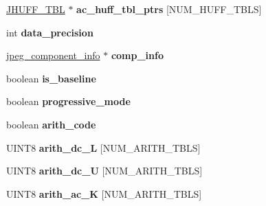\begin{DoxyCompactItemize}
\hyperlink{struct_j_h_u_f_f___t_b_l}{J\+H\+U\+F\+F\+\_\+\+T\+BL} $\ast$ {\bfseries ac\+\_\+huff\+\_\+tbl\+\_\+ptrs} \mbox{[}N\+U\+M\+\_\+\+H\+U\+F\+F\+\_\+\+T\+B\+LS\mbox{]}
\item 
\mbox{\label{structjpeg__decompress__struct_a134188f90a3332d64fc2bcf8af89a12b}} 
int {\bfseries data\+\_\+precision}
\item 
\mbox{\label{structjpeg__decompress__struct_a2cdbc9dbfcf1e9a6e794822c20c067cb}} 
\hyperlink{structjpeg__component__info}{jpeg\+\_\+component\+\_\+info} $\ast$ {\bfseries comp\+\_\+info}
\item 
\mbox{\label{structjpeg__decompress__struct_ac522c292926cf9202a3d706574e5a60c}} 
boolean {\bfseries is\+\_\+baseline}
\item 
\mbox{\label{structjpeg__decompress__struct_adb1267e699e9dc70e6056c85c20a986b}} 
boolean {\bfseries progressive\+\_\+mode}
\item 
\mbox{\label{structjpeg__decompress__struct_a50af15b7b855a6e14f630ccefc0432bf}} 
boolean {\bfseries arith\+\_\+code}
\item 
\mbox{\label{structjpeg__decompress__struct_a8d26a9f37579758d24616cda2c8b4b05}} 
U\+I\+N\+T8 {\bfseries arith\+\_\+dc\+\_\+L} \mbox{[}N\+U\+M\+\_\+\+A\+R\+I\+T\+H\+\_\+\+T\+B\+LS\mbox{]}
\item 
\mbox{\label{structjpeg__decompress__struct_a76c4942c3130cf8481d55c54191ef9f7}} 
U\+I\+N\+T8 {\bfseries arith\+\_\+dc\+\_\+U} \mbox{[}N\+U\+M\+\_\+\+A\+R\+I\+T\+H\+\_\+\+T\+B\+LS\mbox{]}
\item 
\mbox{\label{structjpeg__decompress__struct_ab20a02c95fb17c1ccf3adf3027489890}} 
U\+I\+N\+T8 {\bfseries arith\+\_\+ac\+\_\+K} \mbox{[}N\+U\+M\+\_\+\+A\+R\+I\+T\+H\+\_\+\+T\+B\+LS\mbox{]}
\item 
\mbox{\label{structjpeg__decompress__struct_ac3d5e0468b572f7bb478c507a56f5c58}} 

\end{DoxyCompactItemize}
